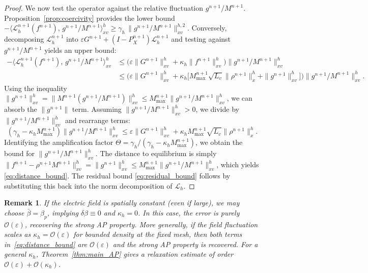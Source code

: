 \documentclass[]{article}
\numberwithin{equation}{section}
\newtheorem{remark}[theorem]{Remark}
\begin{document}
\begin{proof}
We now test the operator against the relative fluctuation $g^{n+1}/M^{n+1}$. Proposition~\ref{prop:coercivity} provides the lower bound $-\langle \mathcal L_{h}^{n+1}(f^{n+1}),\,g^{n+1}/M^{n+1} \rangle_{xv}^h \ge \gamma_h\,\|g^{n+1}/M^{n+1}\|_{xv}^{h,2}$. Conversely, decomposing $\mathcal L_{h}^{n+1}$ into $\varepsilon G^{n+1} + (I-P_X^{n+1})\mathcal L_{h}^{n+1}$ and testing against $g^{n+1}/M^{n+1}$ yields an upper bound:
\begin{align*}
  -\big\langle \mathcal L_{h}^{n+1}(f^{n+1}),\,g^{n+1}/M^{n+1} \big\rangle_{xv}^h
  &\le \big( \varepsilon \|G^{n+1}\|_{xv}^h + \kappa_h \|f^{n+1}\|_{xv}^h \big) \|g^{n+1}/M^{n+1}\|_{xv}^h \\
  &\le \Big( \varepsilon \|G^{n+1}\|_{xv}^h + \kappa_h \big[ M_{\max}^{n+1}\sqrt{L_v}\|\rho^{n+1}\|_x^h + \|g^{n+1}\|_{xv}^h \big] \Big) \|g^{n+1}/M^{n+1}\|_{xv}^h.
\end{align*}
Using the inequality $\|g^{n+1}\|_{xv}^h = \|M^{n+1} (g^{n+1}/M^{n+1})\|_{xv}^h \le M_{\max}^{n+1} \|g^{n+1}/M^{n+1}\|_{xv}^h$, we can absorb the $\|g^{n+1}\|$ term. Assuming $\|g^{n+1}/M^{n+1}\|_{xv}^h > 0$, we divide by $\|g^{n+1}/M^{n+1}\|_{xv}^h$ and rearrange terms:
\[
  (\gamma_h - \kappa_h M_{\max}^{n+1}) \|g^{n+1}/M^{n+1}\|_{xv}^h \le \varepsilon \|G^{n+1}\|_{xv}^h + \kappa_h M_{\max}^{n+1} \sqrt{L_v} \|\rho^{n+1}\|_x^h.
\]
Identifying the amplification factor $\Theta = \gamma_h / (\gamma_h - \kappa_h M_{\max}^{n+1})$, we obtain the bound for $\|g^{n+1}/M^{n+1}\|_{xv}^h$. The distance to equilibrium is simply $\|f^{n+1}-\rho^{n+1}M^{n+1}\|_{xv}^h = \|g^{n+1}\|_{xv}^h \le M_{\max}^{n+1}\|g^{n+1}/M^{n+1}\|_{xv}^h$, which yields \eqref{eq:distance_bound}. The residual bound \eqref{eq:residual_bound} follows by substituting this back into the norm decomposition of $\mathcal{L}_{h}$.
\end{proof}

\begin{remark}
If the electric field is spatially constant (even if large), we may choose $\bar{\beta}=\beta_p$, implying $\delta \beta \equiv 0$ and $\kappa_h = 0$. In this case, the error is purely $\mathcal{O}(\varepsilon)$, recovering the strong AP property.  More generally, if the field fluctuation scales as $\kappa_h = \mathcal{O}(\varepsilon)$ for bounded density at the fixed mesh, then both terms in~\eqref{eq:distance_bound} are $\mathcal{O}(\varepsilon)$ and the strong AP property is recovered.  For a general $\kappa_h$, Theorem~\ref{thm:main_AP} gives a relaxation estimate of order $\mathcal{O}(\varepsilon)+\mathcal{O}(\kappa_h)$.
\end{remark}
\end{document}
